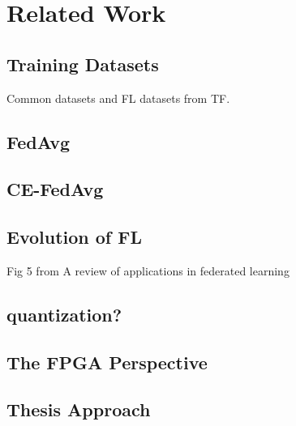 \chapter{Related Work}
\label{Chapter-Related-Work}

\section{Training Datasets}
Common datasets and FL datasets from TF.
\section{FedAvg}
\section{CE-FedAvg}
\section{Evolution of FL}
Fig 5 from A review of applications in federated learning

\section{quantization?}

\section{The FPGA Perspective}
\section{Thesis Approach}
